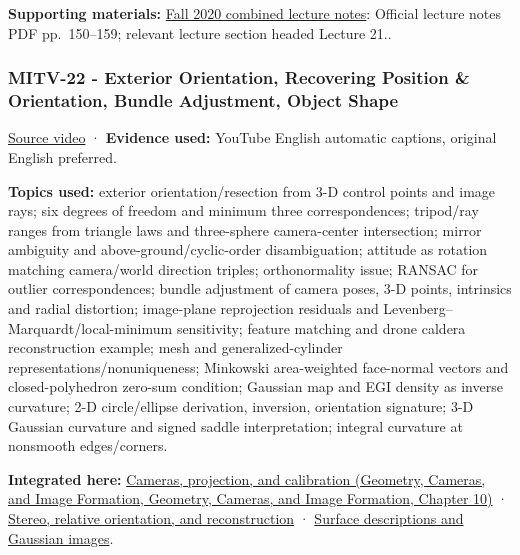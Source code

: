 \textbf{Supporting materials:} \href{https://ocw.mit.edu/courses/6-801-machine-vision-fall-2020/9ec44f69e72995c370b3797818ba01e6_MIT6_801F20_lectureNotes.pdf}{Fall 2020 combined lecture notes}: Official lecture notes PDF pp.~150--159; relevant lecture section headed Lecture 21..

\subsubsection{MITV-22 - Exterior Orientation, Recovering Position \& Orientation, Bundle Adjustment, Object Shape}\label{04-visual-computing-ii-ch036-mitv-22---exterior-orientation-recovering-position-orientation-bundle-adjustment-object-shape}

\href{https://www.youtube.com/watch?v=x4F1oqm7ETk}{Source video} · \textbf{Evidence used:} YouTube English automatic captions, original English preferred.

\textbf{Topics used:} exterior orientation/resection from 3-D control points and image rays; six degrees of freedom and minimum three correspondences; tripod/ray ranges from triangle laws and three-sphere camera-center intersection; mirror ambiguity and above-ground/cyclic-order disambiguation; attitude as rotation matching camera/world direction triples; orthonormality issue; RANSAC for outlier correspondences; bundle adjustment of camera poses, 3-D points, intrinsics and radial distortion; image-plane reprojection residuals and Levenberg--Marquardt/local-minimum sensitivity; feature matching and drone caldera reconstruction example; mesh and generalized-cylinder representations/nonuniqueness; Minkowski area-weighted face-normal vectors and closed-polyhedron zero-sum condition; Gaussian map and EGI density as inverse curvature; 2-D circle/ellipse derivation, inversion, orientation signature; 3-D Gaussian curvature and signed saddle interpretation; integral curvature at nonsmooth edges/corners.

\textbf{Integrated here:} \href{../03-Geometry-Cameras-and-Image-Formation/main.pdf\#nameddest=03-visual-computing-i-ch003-cameras-projection-and-calibration}{Cameras, projection, and calibration (Geometry, Cameras, and Image Formation, Geometry, Cameras, and Image Formation, Chapter 10)} · \hyperref[04-visual-computing-ii-ch032-stereo-relative-orientation-and-reconstruction]{Stereo, relative orientation, and reconstruction} · \hyperref[04-visual-computing-ii-ch032-surface-descriptions-and-gaussian-images]{Surface descriptions and Gaussian images}.

